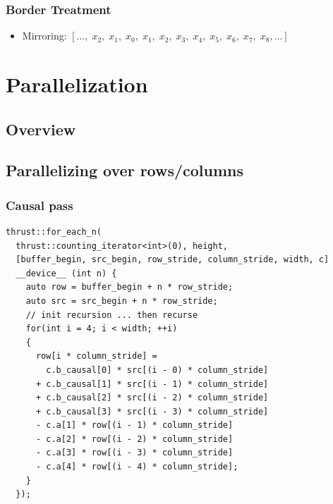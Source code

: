 \documentclass{beamer}
\begin{document}
\begin{frame}
\frametitle{Border Treatment}

\begin{itemize}
\item Mirroring: $[\ldots,\;x_{2},\;x_{1},\;x_0,\;x_{1},\;x_{2},\;x_{3},\;x_{4},\;x_{5},\;x_{6},\;x_{7},\;x_{8},\ldots]$
\end{itemize}
   
\end{frame}

\section{Parallelization}
\subsection{Overview}

\subsection{Parallelizing over rows/columns}
\begin{frame}[fragile]
\frametitle{Causal pass}
  \begin{lstlisting}[basicstyle=\tiny]
thrust::for_each_n(
  thrust::counting_iterator<int>(0), height,
  [buffer_begin, src_begin, row_stride, column_stride, width, c]
  __device__ (int n) {
    auto row = buffer_begin + n * row_stride;
    auto src = src_begin + n * row_stride;
    // init recursion ... then recurse
    for(int i = 4; i < width; ++i)
    {
      row[i * column_stride] =
        c.b_causal[0] * src[(i - 0) * column_stride]
      + c.b_causal[1] * src[(i - 1) * column_stride]
      + c.b_causal[2] * src[(i - 2) * column_stride]
      + c.b_causal[3] * src[(i - 3) * column_stride]
      - c.a[1] * row[(i - 1) * column_stride]
      - c.a[2] * row[(i - 2) * column_stride]
      - c.a[3] * row[(i - 3) * column_stride]
      - c.a[4] * row[(i - 4) * column_stride];
    }
  });
  \end{lstlisting}
\end{frame}
\end{document}
